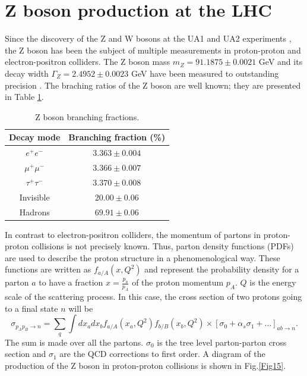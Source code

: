 \section{Z boson production at the LHC}\label{chap2sec0}
Since the discovery of the Z and W bosons at the UA1 and UA2 experiments \cite{Arnison:1983rp,Arnison:1983mk,Banner:1983jy,Bagnaia:1983zx}, the Z boson has been the subject of multiple measurements in proton-proton and electron-positron colliders. The Z boson mass $m_Z=91.1875\pm0.0021$ GeV and its decay width $\Gamma_Z=2.4952\pm0.0023$ GeV have been measured to outstanding precision \cite{ALEPH:2005ab}. The braching ratios of the Z boson are well known; they are presented in Table \ref{Table0}.
\begin{table}[]
	\centering
	\begin{tabular}{cc}
		\hline
		\multicolumn{1}{|c|}{Decay mode} & \multicolumn{1}{c|}{Branching fraction (\%)} \\ \hline
		$e^+e^-$                         & $3.363\pm0.004$                              \\
		$\mu^+\mu^-$                     & $3.366\pm0.007$                              \\
		$\tau^+\tau^-$                   & $3.370\pm0.008$                              \\
		Invisible                        & $20.00\pm0.06$                               \\
		Hadrons                          & $69.91\pm0.06$                               \\ \hline
	\end{tabular}
	\caption{Z boson branching fractions.}
	\label{Table0}
\end{table}
In contrast to electron-positron colliders, the momentum of partons in proton-proton collisions is not precisely known. Thus, parton density functions (PDFs) are used to describe the proton structure in a phenomenological way. These functions are written as $f_{a/A}(x,Q^2)$ and represent the probability density for a parton $a$ to have a fraction $x=\frac{p_a}{p_A}$ of the proton momentum $p_A$. $Q$ is the energy scale of the scattering process. In this case, the cross section of two protons going to a final state $n$ will be
\begin{equation}
	\sigma_{p_Ap_B\to n}=\sum_{q}\int dx_adx_b f_{a/A}(x_a,Q^2) f_{b/B}(x_b,Q^2)\times [\sigma_0+\alpha_s\sigma_1+\dots]_{ab\to n}.
\end{equation}
The sum is made over all the partons. $\sigma_0$ is the tree level parton-parton cross section and $\sigma_1$ are the QCD corrections to first order. A diagram of the production of the Z boson in proton-proton collisions is shown in Fig.\ref{Fig15}. 
